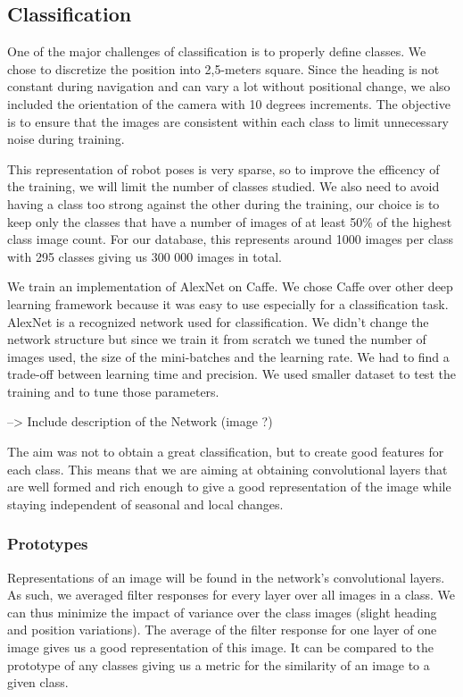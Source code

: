 \subsection{Classification}

One of the major challenges of classification is to properly define classes. We chose to discretize the position into 2,5-meters square. Since the heading is not constant during navigation and can vary a lot without positional change, we also included the orientation of the camera with 10 degrees increments. The objective is to ensure that the images are consistent within each class to limit unnecessary noise during training. 

This representation of robot poses is very sparse, so to improve the efficency of the training, we will limit the number of classes studied. We also need to avoid having a class too strong against the other during the training, our choice is to keep only the classes that have a number of images of at least 50\% of the highest class image count. For our database, this represents around 1000 images per class with 295 classes giving us 300 000 images in total.

We train an implementation of AlexNet on Caffe. We chose Caffe over other deep learning framework because it was easy to use especially for a classification task. AlexNet is a recognized network used for classification. We didn't change the network structure but since we train it from scratch we tuned the number of images used, the size of the mini-batches and the learning rate. We had to find a trade-off between learning time and precision. We used smaller dataset to test the training and to tune those parameters.

--> Include description of the Network (image ?)

The aim was not to obtain a great classification, but to create good features for each class. This means that we are aiming at obtaining convolutional layers that are well formed and rich enough to give a good representation of the image while staying independent of seasonal and local changes.

\subsubsection{Prototypes}
Representations of an image will be found in the network's convolutional layers. As such, we averaged filter responses for every layer over all images in a class. We can thus minimize the impact of variance over the class images (slight heading and position variations). The average of the filter response for one layer of one image gives us a good representation of this image. It can be compared to the prototype of any classes giving us a metric for the similarity of an image to a given class. 
